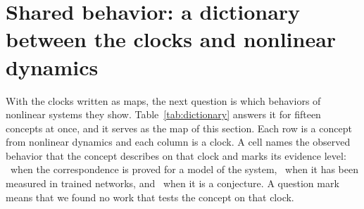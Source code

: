 \section{Shared behavior: a dictionary between the clocks and nonlinear dynamics}
\label{sec:dictionary}
\label{sec:tools}

With the clocks written as maps, the next question is which behaviors of nonlinear systems they show. Table~\ref{tab:dictionary} answers it for fifteen concepts at once, and it serves as the map of this section. Each row is a concept from nonlinear dynamics and each column is a clock. A cell names the observed behavior that the concept describes on that clock and marks its evidence level: \statusP\ when the correspondence is proved for a model of the system, \statusM\ when it has been measured in trained networks, and \statusC\ when it is a conjecture. A question mark means that we found no work that tests the concept on that clock.




